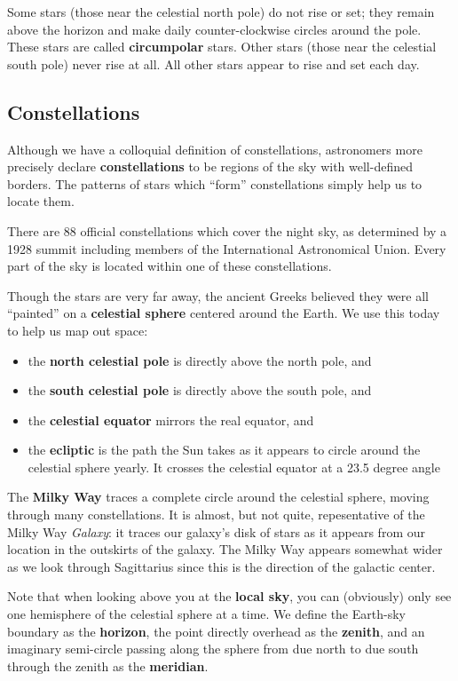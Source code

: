 \documentclass[12pt]{article}
\begin{document}
Some stars (those near the celestial north pole) do not rise or set; they remain above the horizon and make daily counter-clockwise circles around the pole. These stars are called {\bf circumpolar} stars. Other stars (those near the celestial south pole) never rise at all. All other stars appear to rise and set each day.

\subsection{Constellations}
Although we have a colloquial definition of constellations, astronomers more precisely declare {\bf constellations} to be regions of the sky with well-defined borders. The patterns of stars which ``form'' constellations simply help us to locate them.

There are 88 official constellations which cover the night sky, as determined by a 1928 summit including members of the International Astronomical Union. Every part of the sky is located within one of these constellations.

Though the stars are very far away, the ancient Greeks believed they were all ``painted'' on a {\bf celestial sphere} centered around the Earth. We use this today to help us map out space:
\begin{itemize}
\item the {\bf north celestial pole} is directly above the north pole, and
\item the {\bf south celestial pole} is directly above the south pole, and
\item the {\bf celestial equator} mirrors the real equator, and
\item the {\bf ecliptic} is the path the Sun takes as it appears to circle around the celestial sphere yearly. It crosses the celestial equator at a 23.5 degree angle
\end{itemize}

The {\bf Milky Way} traces a complete circle around the celestial sphere, moving through many constellations. It is almost, but not quite, repesentative of the Milky Way \emph{Galaxy}: it traces our galaxy's disk of stars as it appears from our location in the outskirts of the galaxy. The Milky Way appears somewhat wider as we look through Sagittarius since this is the direction of the galactic center.

Note that when looking above you at the {\bf local sky}, you can (obviously) only see one hemisphere of the celestial sphere at a time. We define the Earth-sky boundary as the {\bf horizon}, the point directly overhead as the {\bf zenith}, and an imaginary semi-circle passing along the sphere from due north to due south through the zenith as the {\bf meridian}.
\end{document}
